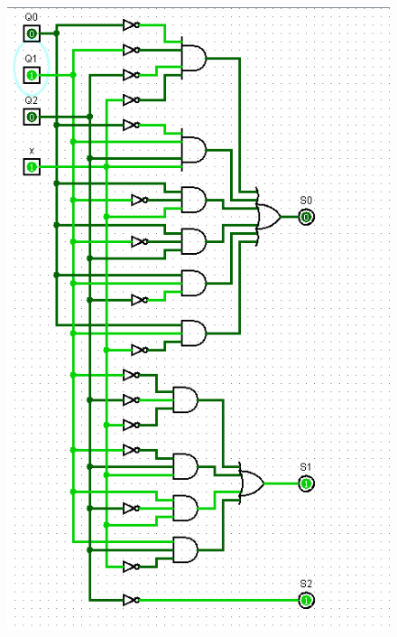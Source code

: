 \documentclass[]{article}
\begin{document}
\begin{minipage}{0.5\textwidth}
\begin{figure}[H]
	\centering
	\includegraphics[width=1\textwidth]{test1_2.png}
\end{figure}
\end{minipage}
\end{document}
